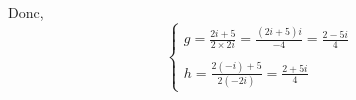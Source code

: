 \begin{exm}
	Donc, \[
		\begin{cases}
			g = \frac{2i + 5}{2\times 2i} = \frac{(2i+5)i}{-4} = \frac{2 - 5i}{4}\\
			~\\
			h = \frac{2(-i) + 5}{2(-2i)} = \frac{2 + 5i}{4}
		\end{cases}
	\]
\end{exm}
